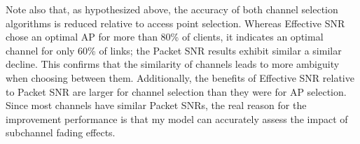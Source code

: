 Note also that, as hypothesized above, the accuracy of both channel selection algorithms is reduced relative to access point selection. Whereas Effective SNR chose an optimal AP for more than 80\% of clients, it indicates an optimal channel for only 60\% of links; the Packet SNR results exhibit similar a similar decline. This confirms that the similarity of channels leads to more ambiguity when choosing between them. Additionally, the benefits of Effective SNR relative to Packet SNR are larger for channel selection than they were for AP selection. Since most channels have similar Packet SNRs, the real reason for the improvement performance is that my model can accurately assess the impact of subchannel fading effects.

%
%
%
